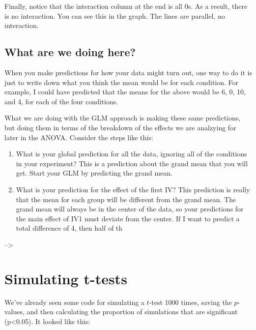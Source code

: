 \documentclass[]{book}
\begin{document}
Finally, notice that the interaction column at the end is all 0s. As a result, there is no interaction. You can see this in the graph. The lines are parallel, no interaction.

\hypertarget{what-are-we-doing-here}{%
\subsection{What are we doing here?}\label{what-are-we-doing-here}}

When you make predictions for how your data might turn out, one way to do it is just to write down what you think the mean would be for each condition. For example, I could have predicted that the means for the above would be 6, 0, 10, and 4, for each of the four conditions.

What we are doing with the GLM approach is making these same predictions, but doing them in terms of the breakdown of the effects we are analzying for later in the ANOVA. Consider the steps like this:

\begin{enumerate}
\def\labelenumi{\arabic{enumi}.}
\item
  What is your global prediction for all the data, ignoring all of the conditions in your experiment? This is a prediction about the grand mean that you will get. Start your GLM by predicting the grand mean.
\item
  What is your prediction for the effect of the first IV? This prediction is really that the mean for each group will be different from the grand mean. The grand mean will always be in the center of the data, so your predictions for the main effect of IV1 must deviate from the center. If I want to predict a total difference of 4, then half of th
\end{enumerate}

--\textgreater{}

\hypertarget{simulating-t-tests}{%
\section{Simulating t-tests}\label{simulating-t-tests}}

We've already seen some code for simulating a \(t\)-test 1000 times, saving the \(p\)-values, and then calculating the proportion of simulations that are significant (p\textless{}0.05). It looked like this:
\end{document}
